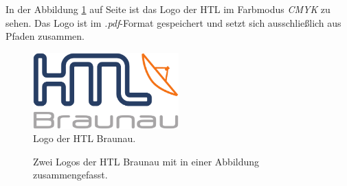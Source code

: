 In der Abbildung \ref{htl01} auf Seite \pageref{htl01} ist das Logo der HTL im Farbmodus \emph{CMYK} zu sehen. Das Logo ist im \emph{.pdf}-Format gespeichert und setzt sich ausschließlich aus Pfaden zusammen.

\begin{figure}[t]
	\centering
	\includegraphics[width=0.5\textwidth]{./media/images/htl_c_cmyk_rein.pdf}
  	\caption{Logo der HTL Braunau.}
  	\label{htl01}
\end{figure}



\begin{figure}[bht]
  \centering
  \qquad
  \label{fig:canvas_01}
\caption[]{Zwei Logos der HTL Braunau mit in einer Abbildung zusammengefasst.}
\end{figure}



